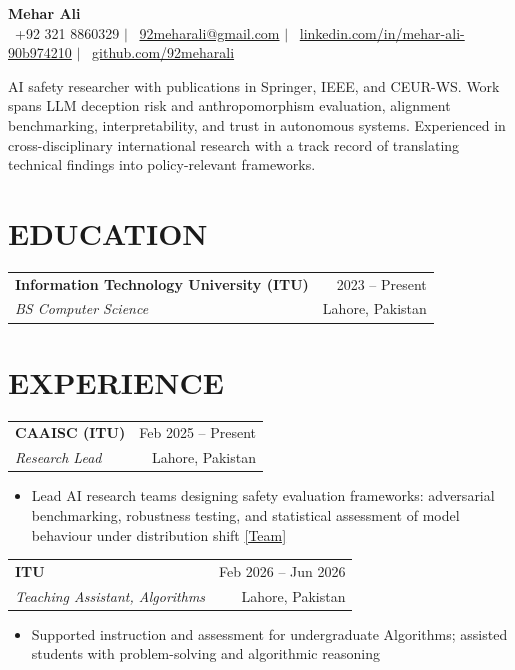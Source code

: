 \documentclass[letterpaper,9pt]{article}
\makeatletter
\newcommand{\resumeItem}[1]{
  \item \small{#1}
}
\newcommand{\resumeSubheading}[4]{
  \vspace{0pt}
  \begin{tabular*}{\textwidth}{l@{\extracolsep{\fill}}r}
    \textbf{\small #1} & {\color{dark-grey}\small #2} \\
    \textit{\small #3} & {\color{dark-grey}\small #4} \\
  \end{tabular*}
  \vspace{-5pt}
}
\makeatother
\begin{document}
\begin{center}
    {\LARGE \textbf{Mehar Ali}} \\ \vspace{3pt}
    \small
    \faPhone* \ +92 321 8860329 \hspace{4pt}$|$\hspace{4pt}
    \faEnvelope \ \href{mailto:92meharali@gmail.com}{92meharali@gmail.com} \hspace{4pt}$|$\hspace{4pt}
    \faLinkedin \ \href{https://www.linkedin.com/in/mehar-ali-90b974210}{linkedin.com/in/mehar-ali-90b974210} \hspace{4pt}$|$\hspace{4pt}
    \faGithub \ \href{https://github.com/92meharali}{github.com/92meharali}
\end{center}

\vspace{-8pt}
\small{AI safety researcher with publications in Springer, IEEE, and CEUR-WS. Work spans LLM deception risk and anthropomorphism evaluation, alignment benchmarking, interpretability, and trust in autonomous systems. Experienced in cross-disciplinary international research with a track record of translating technical findings into policy-relevant frameworks.}

\section{EDUCATION}
\resumeSubheading{Information Technology University (ITU)}{2023 -- Present}{BS Computer Science}{Lahore, Pakistan}

\section{EXPERIENCE}

\resumeSubheading{CAAISC (ITU)}{Feb 2025 -- Present}{Research Lead}{Lahore, Pakistan}
\begin{itemize}
\resumeItem{Lead AI research teams designing safety evaluation frameworks: adversarial benchmarking, robustness testing, and statistical assessment of model behaviour under distribution shift \href{https://caaisc.itu.edu.pk/team}{[Team]}}
\end{itemize}

\resumeSubheading{ITU}{Feb 2026 -- Jun 2026}{Teaching Assistant, Algorithms}{Lahore, Pakistan}
\begin{itemize}
\resumeItem{Supported instruction and assessment for undergraduate Algorithms; assisted students with problem-solving and algorithmic reasoning}
\end{itemize}
\end{document}
